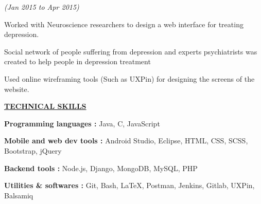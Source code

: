 \documentclass[a4paper]{deedy-resume} %
\begin{document}
\rundescript{}
\hfill {\textit{\small(Jan 2015 to Apr 2015)}}\\
\begin{tightitemize}
\item Worked with Neuroscience researchers to design a web interface for treating depression.
\item Social network of people suffering from depression and experts psychiatrists was created to help people in depression treatment
\item Used online wireframing tools (Such as UXPin) for designing the screens of the website.
\end{tightitemize}




\sectionspace

{\uppercase\uline{\textbf{\large{Technical Skills}}\hfill}}
\microspace
\begin{tightitemize}
\item \textbf{Programming languages \hspace{10pt}:  } Java, C, JavaScript
\item \textbf{Mobile and web dev tools   \hspace{1pt} : } Android Studio, Eclipse, HTML, CSS, SCSS,  Bootstrap, jQuery
\item \textbf{Backend tools  \hspace{51pt} : }   Node.js, Django, MongoDB, MySQL, PHP
\item \textbf{Utilities \& softwares \hspace{27pt}: } Git, Bash, \LaTeX, Postman, Jenkins, Gitlab, UXPin, Balsamiq
\end{tightitemize}
\sectionspace
\end{document}
